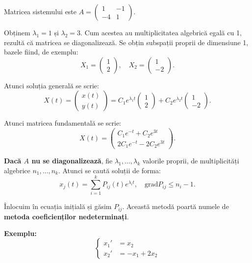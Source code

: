 \documentclass[11pt,a4paper]{article}
\theoremstyle{dotless}
\theoremstyle{dotlessdr}
\begin{document}
Matricea sistemului este $A = \begin{pmatrix} 1 & -1 \\ -4 & 1 \end{pmatrix}$.

Obținem $\lambda_1 = 1$ și $\lambda_2 = 3$. Cum acestea au multiplicitatea algebrică
egală cu 1, rezultă că matricea se diagonalizează. Se obțin subspații proprii de dimensiune
1, bazele fiind, de exemplu:
\[
  X_1 = \begin{pmatrix} 1 \\ 2 \end{pmatrix}, \quad
  X_2 = \begin{pmatrix} 1 \\ -2 \end{pmatrix}.
\]

Atunci soluția generală se scrie:
\[
  X(t) = \begin{pmatrix} x(t) \\ y(t) \end{pmatrix} = %
  C_1 e^{\lambda_1 t} \begin{pmatrix} 1 \\ 2 \end{pmatrix} + %
  C_2 e^{\lambda_2 t} \begin{pmatrix} 1 \\ -2 \end{pmatrix}.
\]

Atunci matricea fundamentală se scrie:
\[
  X(t) = \begin{pmatrix}
    C_1 e^{-t} + C_2 e^{3t} \\
    2C_1 e^{-t} - 2C_2 e^{3t}
  \end{pmatrix}.
\]

\vspace{2cm}

\textbf{Dacă $A$ nu se diagonalizează}, fie $\lambda_1, \dots, \lambda_k$ valorile proprii,
de multiplicități algebrice $n_1, \dots, n_k$. Atunci se caută soluții de forma:
\[
  x_j(t) = \sum_{i = 1}^k P_{ij}(t) e^{\lambda_i t}, \quad \mathrm{grad}P_{ij} \leq n_i - 1.
\]

Înlocuim în ecuația inițială și găsim $P_{ij}$. Această metodă poartă numele de
\textbf{metoda coeficienților nedeterminați}.

\vspace{1cm}

\textbf{Exemplu:}
\[
  \begin{cases}
    x_1' &= x_2 \\
    x_2' &= -x_1 + 2x_2
  \end{cases}
\]
\end{document}
